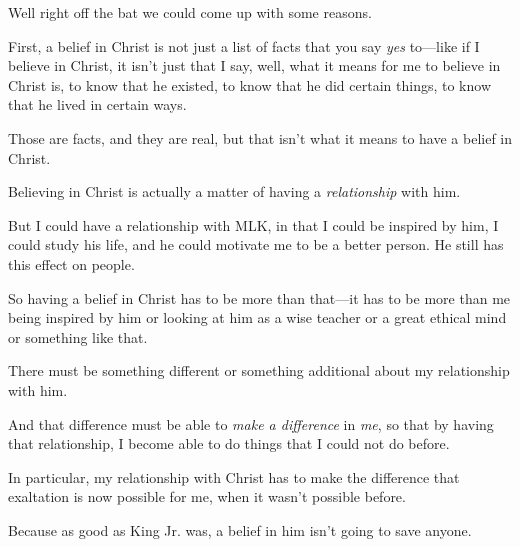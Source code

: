 \begin{compactitem}
			\item Well right off the bat we could come up with some reasons.
				\begin{compactitem}
					\item First, a belief in Christ is not just a list of facts that you say \textit{yes} to---like if I believe in Christ, it isn't just that I say, well, what it means for me to believe in Christ is, to know that he existed, to know that he did certain things, to know that he lived in certain ways.
					\item Those are facts, and they are real, but that isn't what it means to have a belief in Christ.
					\item Believing in Christ is actually a matter of having a \textit{relationship} with him.
					\item But I could have a relationship with MLK, in that I could be inspired by him, I could study his life, and he could motivate me to be a better person. He still has this effect on people.
					\item So having a belief in Christ has to be more than that---it has to be more than me being inspired by him or looking at him as a wise teacher or a great ethical mind or something like that.
					\item There must be something different or something additional about my relationship with him.
					\item And that difference must be able to \textit{make a difference} in \textit{me}, so that by having that relationship, I become able to do things that I could not do before.
					\item In particular, my relationship with Christ has to make the difference that exaltation is now possible for me, when it wasn't possible before.
					\item Because as good as King Jr. was, a belief in him isn't going to save anyone.
				\end{compactitem}
				

\end{compactitem}
